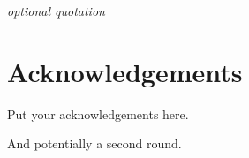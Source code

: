 

\begin{flushright}{\slshape    
optional quotation
}
\end{flushright}

\bigskip


\begingroup

\let\clearpage\relax
\let\cleardoublepage\relax
\let\cleardoublepage\relax

\chapter*{Acknowledgements}

\noindent Put your acknowledgements here.\\

\bigskip

\noindent And potentially a second round.\\

\endgroup
